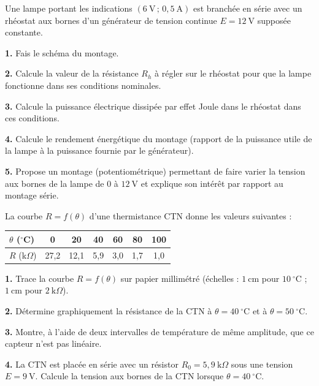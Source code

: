 \documentclass[11pt]{article}
\newcounter{popsec}
\newcounter{popsub}
\newcommand{\courssub}[1]{%
  \stepcounter{popsub}%
  \par\vspace{9pt}\noindent{\popxbold\fontsize{11.5}{13}\selectfont\color{popink}{\color{poporange}\thepopsec.\thepopsub}\hspace{6pt}#1}\par\nopagebreak\vspace{4pt}
}
\begin{document}
\courssub{Je m'entraîne}

\begin{exercice}
Une lampe portant les indications $(6~\text{V}\,;\,0{,}5~\text{A})$ est branchée en série avec un rhéostat aux bornes d'un générateur de tension continue $E = 12~\text{V}$ supposée constante.

\textbf{1.} Fais le schéma du montage.

\textbf{2.} Calcule la valeur de la résistance $R_h$ à régler sur le rhéostat pour que la lampe fonctionne dans ses conditions nominales.

\textbf{3.} Calcule la puissance électrique dissipée par effet Joule dans le rhéostat dans ces conditions.

\textbf{4.} Calcule le rendement énergétique du montage (rapport de la puissance utile de la lampe à la puissance fournie par le générateur).

\textbf{5.} Propose un montage (potentiométrique) permettant de faire varier la tension aux bornes de la lampe de $0$ à $12~\text{V}$ et explique son intérêt par rapport au montage série.
\end{exercice}

\begin{exercice}
La courbe $R = f(\theta)$ d'une thermistance CTN donne les valeurs suivantes :

\begin{center}
\begin{tabular}{|l|c|c|c|c|c|c|}
\hline
\rowcolor{popblueL} $\theta$ ($^\circ$C) & 0 & 20 & 40 & 60 & 80 & 100 \\
\hline
$R$ (k$\Omega$) & 27{,}2 & 12{,}1 & 5{,}9 & 3{,}0 & 1{,}7 & 1{,}0 \\
\hline
\end{tabular}
\end{center}

\textbf{1.} Trace la courbe $R = f(\theta)$ sur papier millimétré (échelles : $1~\text{cm}$ pour $10~^\circ\text{C}$ ; $1~\text{cm}$ pour $2~\text{k}\Omega$).

\textbf{2.} Détermine graphiquement la résistance de la CTN à $\theta = 40~^\circ\text{C}$ et à $\theta = 50~^\circ\text{C}$.

\textbf{3.} Montre, à l'aide de deux intervalles de température de même amplitude, que ce capteur n'est pas linéaire.

\textbf{4.} La CTN est placée en série avec un résistor $R_0 = 5{,}9~\text{k}\Omega$ sous une tension $E = 9~\text{V}$. Calcule la tension aux bornes de la CTN lorsque $\theta = 40~^\circ\text{C}$.
\end{exercice}
\end{document}
